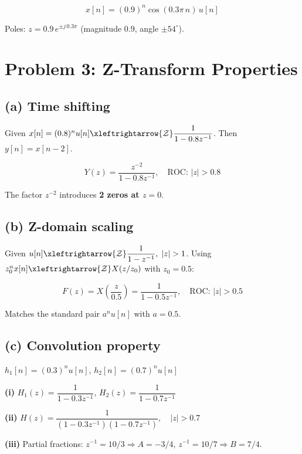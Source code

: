 \documentclass[11pt]{article}
\newcommand{\zt}{\xleftrightarrow{\mathcal{Z}}}
\begin{document}
\begin{equation*}
\boxed{x[n] = (0.9)^n \cos(0.3\pi\,n)\,u[n]}
\end{equation*}

Poles: $z = 0.9\,e^{\pm j\,0.3\pi}$ (magnitude $0.9$, angle $\pm 54^\circ$).

\section*{Problem 3: Z-Transform Properties}

\subsection*{(a) Time shifting}

Given $x[n] = (0.8)^n u[n] \zt \dfrac{1}{1 - 0.8z^{-1}}$. Then $y[n] = x[n-2]$.

\begin{equation*}
\boxed{Y(z) = \frac{z^{-2}}{1 - 0.8z^{-1}}, \quad \text{ROC: } |z| > 0.8}
\end{equation*}

The factor $z^{-2}$ introduces \textbf{2 zeros at $z = 0$}.

\subsection*{(b) Z-domain scaling}

Given $u[n] \zt \dfrac{1}{1 - z^{-1}},\; |z|>1$. Using $z_0^n x[n] \zt X(z/z_0)$ with $z_0 = 0.5$:

\[
F(z) = X\!\left(\frac{z}{0.5}\right) = \frac{1}{1 - 0.5z^{-1}}, \quad \text{ROC: } |z| > 0.5
\]

Matches the standard pair $a^n u[n]$ with $a = 0.5$. \checkmark

\subsection*{(c) Convolution property}

$h_1[n] = (0.3)^n u[n]$, \quad $h_2[n] = (0.7)^n u[n]$

\textbf{(i)} $H_1(z) = \dfrac{1}{1 - 0.3z^{-1}}$, \quad $H_2(z) = \dfrac{1}{1 - 0.7z^{-1}}$

\textbf{(ii)} $H(z) = \dfrac{1}{(1 - 0.3z^{-1})(1 - 0.7z^{-1})}, \quad |z| > 0.7$

\textbf{(iii)} Partial fractions: $z^{-1}=10/3 \Rightarrow A = -3/4$, \quad $z^{-1}=10/7 \Rightarrow B = 7/4$.
\end{document}
